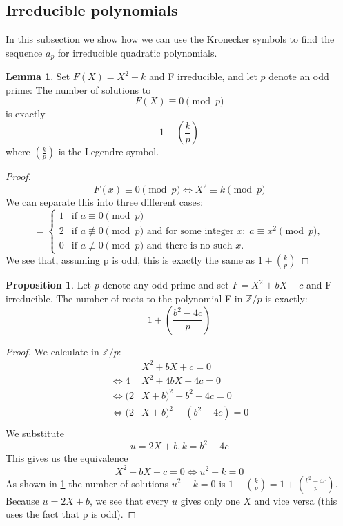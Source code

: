 \documentclass{article}
\theoremstyle{definition}
\newtheorem{lemma}[theorem]{Lemma}
\newtheorem{proposition}[theorem]{Proposition}
\theoremstyle{remark}
\begin{document}
\subsection{Irreducible polynomials}
In this subsection we show how we can use the Kronecker symbols to find the sequence $a_p$ for irreducible quadratic polynomials.
\begin{lemma} \label{Lemma1}
Set $F(X)=X^2-k$ and F irreducible, and let $p$ denote an odd prime:
\newline
The number of solutions to $$F(X)\equiv 0 \pmod{p}$$
is exactly $$1+\left(\frac{k}{p}\right)$$
where $(\frac{k}{p})$ is the Legendre symbol.
\end{lemma}
\begin{proof}
$$F(x)\equiv 0 \pmod{p} \Leftrightarrow  X^2\equiv k \pmod{p}$$
We can separate this into three different cases:
$$= \begin{cases}
1  & \text{if } a \equiv 0\pmod{p} \\
2 & \text{if } a \not\equiv 0\pmod{p} \text{ and for some integer } x\colon\;a\equiv x^2\pmod{p},\\
0 & \text{if } a \not\equiv 0\pmod{p} \text{ and there is no such } x.
\end{cases}$$
We see that, assuming p is odd, this is exactly the same as $1+(\frac{k}{p})$
\end{proof}
\begin{proposition} \label{alex5}
Let $p$ denote any odd prime and set $F=X^2+bX+c$ and F irreducible.
The number of roots to the polynomial F in $\mathbb{Z}/p$ is exactly: $$1+\left(\frac{b^2-4c}{p}\right)$$
\end{proposition}
\begin{proof}
We calculate in $\mathbb{Z}/p$:
\begin{equation}
\begin{split}
& X^2+bX+c=0 \\
 \Leftrightarrow 4&X^2+4bX+4c=0 \\
 \Leftrightarrow (2&X+b)^2-b^2+4c = 0 \\
 \Leftrightarrow (2&X+b)^2-(b^2-4c) = 0 \\
\end{split}
\end{equation}
We substitute
$$u=2X+b, k=b^2-4c$$
This gives us the equivalence
$$X^2+bX+c=0 \Leftrightarrow u^2-k=0$$
As shown in \ref{Lemma1} the number of solutions $u^2-k=0$ is $1+(\frac{k}{p})=1+(\frac{b^2-4c}{p})$.
Because $u=2X+b$, we see that every $u$ gives only one $X$ and vice versa (this uses the fact that p is odd).
\end{proof}
\end{document}
